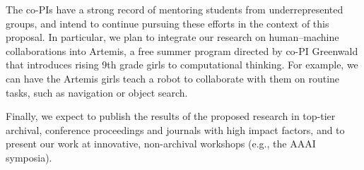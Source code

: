 

The co-PIs have a strong record of mentoring students from
underrepresented groups, and intend to continue pursuing these efforts
in the context of this proposal.  In particular, we plan to integrate
our research on human--machine collaborations into Artemis, a free
summer program directed by co-PI Greenwald that introduces rising 9th
grade girls to computational thinking.  For example, we can have the
Artemis girls teach a robot to collaborate with them on routine tasks,
such as navigation or object search.



Finally, we expect to publish the results of the proposed research in
top-tier archival, conference proceedings and journals with high
impact factors, and to present our work at innovative, non-archival
workshops (e.g., the AAAI symposia).

